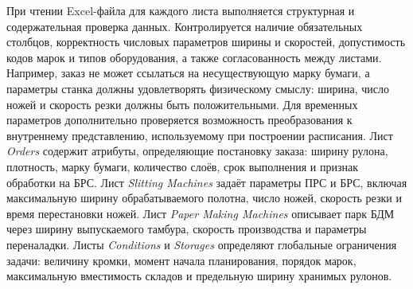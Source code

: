 При чтении Excel-файла для каждого листа выполняется структурная и содержательная проверка данных. Контролируется наличие обязательных столбцов, корректность числовых параметров ширины и скоростей, допустимость кодов марок и типов оборудования, а также согласованность между листами. Например, заказ не может ссылаться на несуществующую марку бумаги, а параметры станка должны удовлетворять физическому смыслу: ширина, число ножей и скорость резки должны быть положительными. Для временных параметров дополнительно проверяется возможность преобразования к внутреннему представлению, используемому при построении расписания.
Лист \textit{Orders} содержит атрибуты, определяющие постановку заказа: ширину рулона, плотность, марку бумаги, количество слоёв, срок выполнения и признак обработки на БРС. Лист \textit{Slitting Machines} задаёт параметры ПРС и БРС, включая максимальную ширину обрабатываемого полотна, число ножей, скорость резки и время перестановки ножей. Лист \textit{Paper Making Machines} описывает парк БДМ через ширину выпускаемого тамбура, скорость производства и параметры переналадки. Листы \textit{Conditions} и \textit{Storages} определяют глобальные ограничения задачи: величину кромки, момент начала планирования, порядок марок, максимальную вместимость складов и предельную ширину хранимых рулонов.

